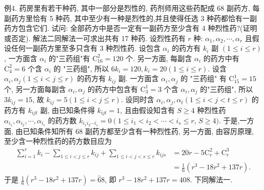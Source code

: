 例4. 药房里有若干种药, 其中一部分是烈性的, 药剂师用这些药配成 68 副药方, 每副药方里恰有 5 种药, 其中至少有一种是烈性的,并且使得任选 3 种药都恰有一副药方包含它们.
试问: 全部药方中是否一定有一副药方至少含有 4 种烈性药?(证明或否定).
解法二同解法一可求出共有 17 种药.
设烈性药有 $r$ 种: $\alpha_1, \alpha_2, \cdots, \alpha_r$ 且假设任何一副药方里至多只含有 3 种烈性药.
设包含 $\alpha_i$ 的药方有 $k_i$ 副 $(1 \leqslant i \leqslant r)$, 一方面含 $\alpha_i$ 的"三药组"有 $\mathrm{C}_{16}^2=120$ 个.
另一方面, 每副含 $\alpha_i$ 的药方中有 $\mathrm{C}_4^2=6$ 个含 $\alpha_i$ 的 "三药组", 所以 $6 k_i=120, k_i=20(1 \leqslant i \leqslant r)$. 设含 $\alpha_i, \alpha_j(1 \leqslant i<j \leqslant r)$ 的药方有 $k_{i j}$ 副.
一方面含 $\alpha_i, \alpha_j$ 的 "三药组" 有 $\mathrm{C}_{15}^1=15$ 个, 另一方面每副含 $\alpha_i, \alpha_j$ 的药方中包含有 $\mathrm{C}_3^1=3$ 个含 $\alpha_i, \alpha_j$ 的"三药组", 所以 $3 k_{i j}=15$, 故 $k_{i j}=5(1 \leqslant i<j \leqslant r)$. 设同时含 $\alpha_i, \alpha_j, \alpha_t(1 \leqslant i<j<t \leqslant r)$ 的药方有 $k_{i j t}$ 副, 由已知条件得 $k_{i j t}=1$, 且由假设知含有 $S \geqslant 4$ 种烈性药 $\alpha_{i_1}, \alpha_{i_2}, \cdots, \alpha_{i_s}$ 的药方数 $k_{i_1 i_2 \cdots i_s}=0\left(1 \leqslant i_1<i_2<\cdots<i_s \leqslant r\right.$, $S \geqslant 4)$. 于是,一方面, 由已知条件知所有 68 副药方都至少含有一种烈性药, 另一方面, 由容厉原理, 至少含一种烈性药的药方数目应为
$$
\begin{aligned}
\sum_{i=1}^r k_i-\sum_{1 \leqslant i<j \leqslant r} k_{i j}+\sum_{1 \leqslant i<j<s \leqslant r} k_{i j s} & =20 r-5 \mathrm{C}_r^2+\mathrm{C}_r^3 \\
& =\frac{1}{6}\left(r^3-18 r^2+137 r\right) .
\end{aligned}
$$
于是 $\frac{1}{6}\left(r^3-18 r^2+137 r\right)=\hat{6} 8$, 即 $r^3-18 r^2+137 r=408$.
下同解法一.



